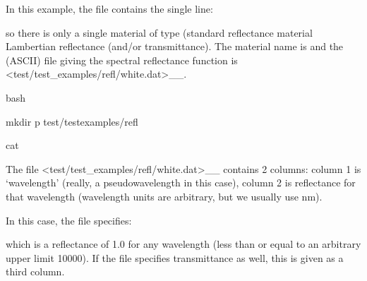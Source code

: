 \documentclass[letterpaper,10pt,english]{sphinxmanual}
\begin{document}
In this example, the file contains the single line:

\begin{sphinxVerbatim}[commandchars=\\\{\}]
  
\end{sphinxVerbatim}

so there is only a single material of type  (standard reflectance material \sphinxhyphen{} Lambertian reflectance (and/or transmittance). The material name is  and the (ASCII) file giving the spectral reflectance function is  \textless{}test/test\_examples/refl/white.dat\textgreater{}\textasciigrave{}\_\_.

{
\begin{sphinxVerbatim}[commandchars=\\\{\}]
\llap{\color{nbsphinxin}[4]:\,\hspace{\fboxrule}\hspace{\fboxsep}}\PYGZpc{}\PYGZpc{}bash

mkdir \PYGZhy{}p test/test\PYGZus{}examples/refl

cat 
\end{sphinxVerbatim}
}

The file  \textless{}test/test\_examples/refl/white.dat\textgreater{}\textasciigrave{}\_\_ contains 2 columns: column 1 is ‘wavelength’ (really, a pseudo\sphinxhyphen{}wavelength in this case), column 2 is reflectance for that wavelength (wavelength units are arbitrary, but we usually use nm).

In this case, the file specifies:

\begin{sphinxVerbatim}[commandchars=\\\{\}]
 
 
\end{sphinxVerbatim}

which is a reflectance of 1.0 for any wavelength (less than or equal to an arbitrary upper limit 10000). If the file specifies transmittance as well, this is given as a third column.
\end{document}
